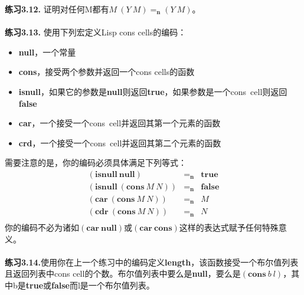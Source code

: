 \documentclass{book}
\def\n{\mathbf{n}}
\def\lianxi{\noindent \makebox[0pt][r]{$\rhd$} \textbf}
\begin{document}
\lianxi{练习3.12.} 证明对任何M都有$M\ (Y\ M)=_\n (Y\ M)$。\\\\
\lianxi{练习3.13.} 使用下列宏定义Lisp cons cells的编码：
\begin{itemize}
 \item \textbf{null}，一个常量
 \item \textbf{cons}，接受两个参数并返回一个cons cells的函数
 \item \textbf{isnull}，如果它的参数是\textbf{null}则返回\textbf{true}，如果参数是一个cons\ cell则返回\textbf{false}
 \item \textbf{car}，一个接受一个cons\ cell并返回其第一个元素的函数
 \item \textbf{crd}，一个接受一个cons\ cell并返回其第二个元素的函数
\end{itemize}
需要注意的是，你的编码必须具体满足下列等式：
$$
\begin{array}{lcl}
 (\mathbf{isnull\ null}) & =_\n & \mathbf{true} \\
 (\mathbf{isnull\ }(\mathbf{cons}\ M\ N)) & =_\n & \mathbf{false} \\
 (\mathbf{car\ }(\mathbf{cons}\ M\ N)) & =_\n & M \\
 (\mathbf{cdr\ }(\mathbf{cons}\ M\ N)) & =_\n & N \\
\end{array}
$$
你的编码不必为诸如$(\mathbf{car\ null})$或$(\mathbf{car\ cons})$这样的表达式赋予任何特殊意义。\\\\
\lianxi{练习3.14.}使用你在上一个练习中的编码定义\textbf{length}，该函数接受一个布尔值列表且返回列表中cons cell的个数。布尔值列表中要么是\textbf{null}，要么是$(\mathbf{cons}\ b\ l)$，其中b是\textbf{true}或\textbf{false}而l是一个布尔值列表。
\end{document}
